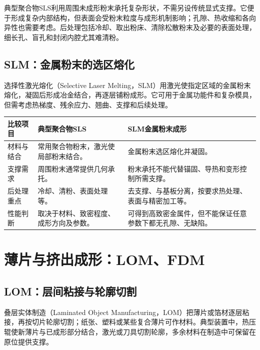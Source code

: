 典型聚合物SLS利用周围未成形粉末承托复杂形状，不需另设传统显式支撑。它便于形成复杂内部结构，但表面会受粉末粒度与成形机制影响；孔隙、热收缩和各向异性也需要考虑。后处理包括冷却、取出粉床、清除松散粉末及必要的表面处理，细长孔、盲孔和封闭内腔尤其难清粉。

\subsection{SLM：金属粉末的选区熔化}
选择性激光熔化（Selective Laser Melting，SLM）用激光使指定区域的金属粉末熔化，凝固后形成冶金结合，再逐层铺粉成形。它可用于金属功能件和复杂模具，但需考虑热梯度、残余应力、翘曲、支撑和后续处理。

\begin{table}[H]
\centering\small
\begin{tabularx}{\linewidth}{@{}p{2cm} X X@{}}
\toprule
比较项目 & 典型聚合物SLS & SLM金属粉末成形 \\
\midrule
材料与结合 & 常用聚合物粉末，激光使局部粉末结合。 & 金属粉末选区熔化并凝固。 \\
支撑需求 & 周围粉末通常提供几何承托。 & 粉末承托不能代替锚固、导热和变形控制所需支撑。 \\
后处理重点 & 冷却、清粉、表面处理等。 & 去支撑、与基板分离，按要求热处理、表面与精密加工等。 \\
性能判断 & 取决于材料、致密程度、成形方向及参数。 & 可得到高致密金属件，但不能保证任意参数下都无孔隙、无缺陷。 \\
\bottomrule
\end{tabularx}
\end{table}


\section{薄片与挤出成形：LOM、FDM}
\subsection{LOM：层间粘接与轮廓切割}
叠层实体制造（Laminated Object Manufacturing，LOM）把薄片或箔材逐层粘接，再按切片轮廓切割；纸张、塑料或某些复合薄片可作材料。典型装置中，热压辊使新薄片与已成形部分结合，激光或刀具切割轮廓，多余材料在制造中可保留在原位提供支撑。

